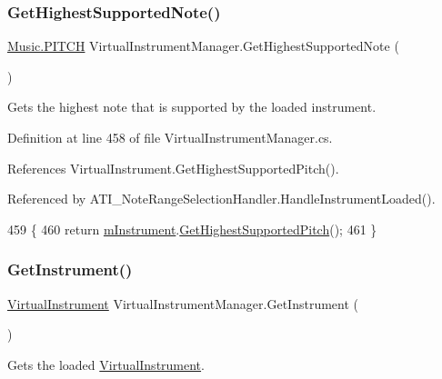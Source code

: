 \subsubsection{\texorpdfstring{Get\+Highest\+Supported\+Note()}{GetHighestSupportedNote()}}
{\footnotesize\ttfamily \hyperlink{group___music_enums_ga508f69b199ea518f935486c990edac1d}{Music.\+P\+I\+T\+CH} Virtual\+Instrument\+Manager.\+Get\+Highest\+Supported\+Note (\begin{DoxyParamCaption}{ }\end{DoxyParamCaption})}



Gets the highest note that is supported by the loaded instrument. 



Definition at line 458 of file Virtual\+Instrument\+Manager.\+cs.



References Virtual\+Instrument.\+Get\+Highest\+Supported\+Pitch().



Referenced by A\+T\+I\+\_\+\+Note\+Range\+Selection\+Handler.\+Handle\+Instrument\+Loaded().


\begin{DoxyCode}
459     \{
460         \textcolor{keywordflow}{return} \hyperlink{group___v_i_m_priv_gaed435d1f9be09864846db4322dc21fd1}{mInstrument}.\hyperlink{group___v_i_base_pub_func_ga859f3e73b1d28051cecf0ecd1c8b10ee}{GetHighestSupportedPitch}();
461     \}
\end{DoxyCode}
\mbox{\label{group___v_i_m_pub_func_gac39a3e411417dc010f0e4fd8f146fbc3}} 
\subsubsection{\texorpdfstring{Get\+Instrument()}{GetInstrument()}}
{\footnotesize\ttfamily \hyperlink{class_virtual_instrument}{Virtual\+Instrument} Virtual\+Instrument\+Manager.\+Get\+Instrument (\begin{DoxyParamCaption}{ }\end{DoxyParamCaption})}



Gets the loaded \hyperlink{class_virtual_instrument}{Virtual\+Instrument}. 



